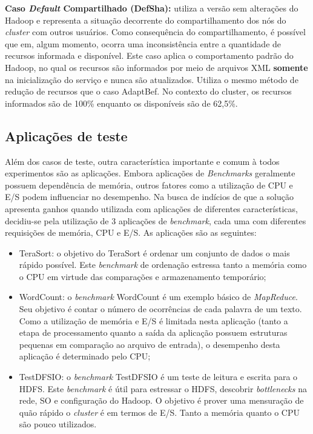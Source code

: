 \textbf{Caso \textit{Default} Compartilhado (DefSha):} utiliza a versão sem alterações do Hadoop e representa a situação decorrente do compartilhamento dos nós do \textit{cluster} com outros usuários. Como consequência do compartilhamento, é possível que em, algum momento, ocorra uma inconsistência entre a quantidade de recursos informada e disponível. Este caso aplica o comportamento padrão do Hadoop, no qual os recursos são informados por meio de arquivos XML \textbf{somente} na inicialização do serviço e nunca são atualizados. Utiliza o mesmo método de redução de recursos que o caso AdaptBef. No contexto do cluster, os recursos informados são de 100\% enquanto os disponíveis são de 62,5\%.

\subsection{Aplicações de teste}
\label{sec:aplicacoes}
Além dos casos de teste, outra característica importante e comum à todos experimentos são as aplicações. Embora aplicações de \textit{Benchmarks} geralmente possuem dependência de memória, outros fatores como a utilização de CPU e E/S podem influenciar no desempenho. Na busca de indícios de que a solução apresenta ganhos quando utilizada com aplicações de diferentes características, decidiu-se pela utilização de 3 aplicações de \textit{benchmark}, cada uma com diferentes requisições de memória, CPU e E/S. As aplicações são as seguintes:

\begin{itemize}
	\item TeraSort: o objetivo do TeraSort \citet{TeraSort2008} é ordenar um conjunto de dados o mais rápido possível. Este \textit{benchmark} de ordenação estressa tanto a memória como o CPU em virtude das comparações e armazenamento temporário;
	\item WordCount: o \textit{benchmark} WordCount é um exemplo básico de \textit{MapReduce}. Seu objetivo é contar o número de ocorrências de cada palavra de um texto. Como a utilização de memória e E/S é limitada nesta aplicação (tanto a etapa de processamento quanto a saída da aplicação possuem estruturas pequenas em comparação ao arquivo de entrada), o desempenho desta aplicação é determinado pelo CPU;
	\item TestDFSIO: o \textit{benchmark} TestDFSIO é um teste de leitura e escrita para o HDFS. Este \textit{benchmark} é útil para estressar o HDFS, descobrir \textit{bottlenecks} na rede, SO e configuração do Hadoop. O objetivo é prover uma mensuração de quão rápido o \textit{cluster} é em termos de E/S. Tanto a memória quanto o CPU são pouco utilizados.
\end{itemize}

